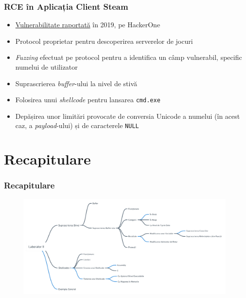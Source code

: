 \documentclass[xcolor={table}]{beamer}
\begin{document}
	\begin{frame}
		\frametitle{RCE în Aplicația Client Steam}\pause
		\begin{itemize}[<+->]
		    \item \href{https://hackerone.com/reports/470520}{Vulnerabilitate raportată} în 2019, pe HackerOne
			\item Protocol proprietar pentru descoperirea serverelor de jocuri
			\item \textit{Fuzzing} efectuat pe protocol pentru a identifica un câmp vulnerabil, specific numelui de utilizator
			\item Suprascrierea \textit{buffer}-ului la nivel de stivă
			\item Folosirea unui \textit{shellcode} pentru lansarea \texttt{cmd.exe}
			\item Depășirea unor limitări provocate de conversia Unicode a numelui (în acest caz, a \textit{payload}-ului) și de caracterele \texttt{NULL}
		\end{itemize}
	\end{frame}
	
	\section{Recapitulare}

	\begin{frame}
		\frametitle{Recapitulare}\pause
		\begin{figure}
            \centering
            \includegraphics[width=11cm]{images/recap.png}
        \end{figure}
	\end{frame}
\end{document}
